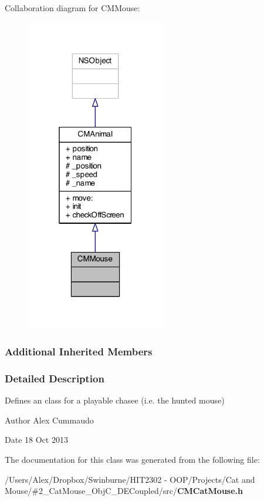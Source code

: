 Collaboration diagram for C\-M\-Mouse\-:
\nopagebreak
\begin{figure}[H]
\begin{center}
\leavevmode
\includegraphics[width=172pt]{interface_c_m_mouse__coll__graph}
\end{center}
\end{figure}
\subsubsection*{Additional Inherited Members}


\subsubsection{Detailed Description}
Defines an class for a playable chasee (i.\-e. the hunted mouse) 

\begin{DoxyAuthor}{Author}
Alex Cummaudo 
\end{DoxyAuthor}
\begin{DoxyDate}{Date}
18 Oct 2013 
\end{DoxyDate}


The documentation for this class was generated from the following file\-:\begin{DoxyCompactItemize}
\item 
/\-Users/\-Alex/\-Dropbox/\-Swinburne/\-H\-I\-T2302 -\/ O\-O\-P/\-Projects/\-Cat and Mouse/\#2\-\_\-\-Cat\-Mouse\-\_\-\-Obj\-C\-\_\-\-D\-E\-Coupled/src/{\bf C\-M\-Cat\-Mouse.\-h}\end{DoxyCompactItemize}
